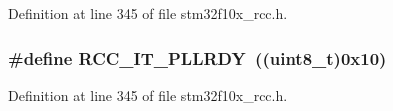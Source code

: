 Definition at line 345 of file stm32f10x\+\_\+rcc.\+h.

\subsubsection[{\texorpdfstring{R\+C\+C\+\_\+\+I\+T\+\_\+\+P\+L\+L\+R\+DY}{RCC_IT_PLLRDY}}]{\setlength{\rightskip}{0pt plus 5cm}\#define R\+C\+C\+\_\+\+I\+T\+\_\+\+P\+L\+L\+R\+DY~(({\bf uint8\+\_\+t})0x10)}\hypertarget{group___r_c_c___interrupt__source_ga68d48e7811fb58f2649dce6cf0d823d9}{}\label{group___r_c_c___interrupt__source_ga68d48e7811fb58f2649dce6cf0d823d9}


Definition at line 345 of file stm32f10x\+\_\+rcc.\+h.

